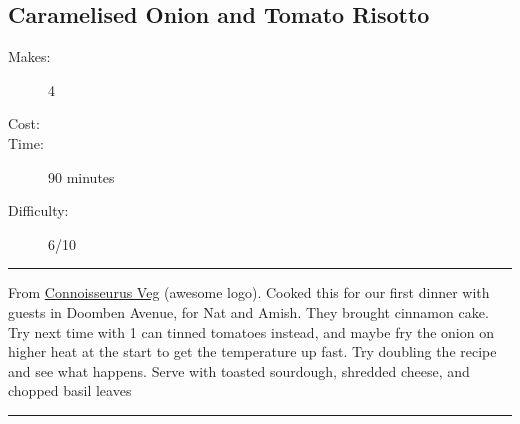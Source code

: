 \documentclass[]{article}
\begin{document}
\subsection*{\center\huge Caramelised Onion and Tomato Risotto}
\begin{description}
\item[Makes:] 4 
\item[Cost:] \textdollar
\item[Time:] 90 minutes
\item[Difficulty:] 6/10
\end{description}
\vspace{0.2cm}\hrule\vspace{0.5cm}
\begin{adjustwidth}{0.5 cm}{0.5 cm}

From \href{https://www.connoisseurusveg.com/tomato-risotto/}{Connoisseurus Veg} (awesome logo). Cooked this for our first dinner with guests in Doomben Avenue, for Nat and Amish. They brought cinnamon cake. Try next time with 1 can tinned tomatoes instead, and maybe fry the onion on higher heat at the start to get the temperature up fast. Try doubling the recipe and see what happens. Serve with toasted sourdough, shredded cheese, and chopped basil leaves \hfill{}\color{black}

\end{adjustwidth}
\vspace{0.5cm}\hrule
\end{document}

